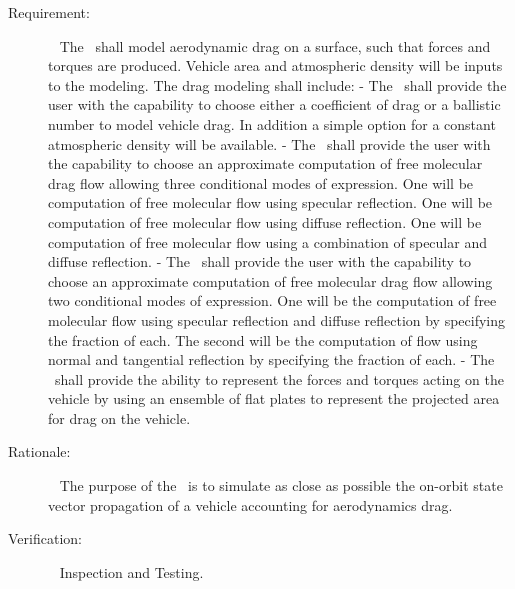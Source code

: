 \label{reqt:drag}
\begin{description}
  \item[Requirement:]\ \newline
   The \aerodynamicsDesc\ shall model aerodynamic drag on a surface, such that
    forces and torques are produced.
    Vehicle area and atmospheric density will be inputs to the modeling.
    The drag modeling shall include:
    \label{reqt:sd} -
      The \aerodynamicsDesc\ shall provide the user with the capability to choose
      either a coefficient of drag or a ballistic number to model vehicle
      drag. In addition a simple option for a constant atmospheric density
      will be available.
    \label{reqt:AFM} -
      The \aerodynamicsDesc\ shall provide the user with the capability to choose
      an approximate computation of free molecular drag flow allowing three
      conditional modes of expression. One will be computation of free
      molecular flow using specular reflection. One will be computation of
      free molecular flow using diffuse reflection. One will be computation
      of free molecular flow using a combination of specular and diffuse
      reflection.
    \label{reqt:FMF} -
      The \aerodynamicsDesc\ shall provide the user with the capability to choose
      an approximate computation of free molecular drag flow allowing two
      conditional modes of expression. One will be the computation of free
      molecular flow using specular reflection and diffuse reflection by
      specifying the fraction of each. The second will be
      the computation of flow using normal and tangential reflection by
      specifying the fraction of each.
    \label{reqt:AS} -
      The \aerodynamicsDesc\ shall provide the ability to represent the forces and
      torques acting on the vehicle by using an ensemble of flat plates to
      represent the projected area for drag on the vehicle.
  \item[Rationale:]\ \newline
    The purpose of the \aerodynamicsDesc\ is to simulate as close as possible the
    on-orbit state vector propagation of a vehicle accounting for aerodynamics
    drag.
  \item[Verification:]\ \newline
    Inspection and Testing.

\end{description}


